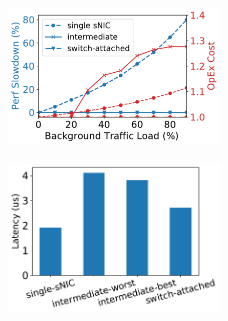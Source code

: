 {
\begin{figure}[h]
\begin{center}
\centerline{\includegraphics[width=0.5\textwidth]{snic/Figures/fig-dist-nic-load-increase.pdf}}
{
}
\end{center}
\end{figure}
}
{
\begin{figure}[h]
\begin{center}
\centerline{\includegraphics[width=0.5\textwidth]{snic/Figures/fig-dist-nic-latency.pdf}}
{
}
\end{center}
\end{figure}
}